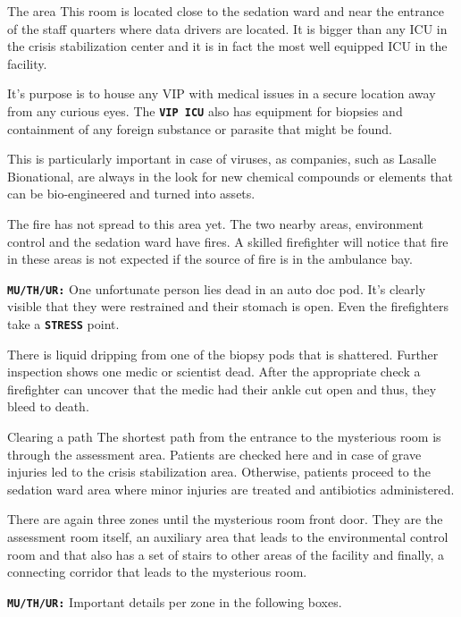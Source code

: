 \begin{rpg-commentbox}{The area}
    This room is located close to the sedation ward and near the entrance of the staff quarters where data drivers are located. It is bigger than any ICU in the crisis stabilization center and it is in fact the most well equipped ICU in the facility.

    It's purpose is to house any VIP with medical issues in a secure location away from any curious eyes. The \texttt{\textbf{VIP ICU}} also has equipment for biopsies and containment of any foreign substance or parasite that might be found. 

    This is particularly important in case of viruses, as companies, such as Lasalle Bionational, are always in the look for new chemical compounds or elements that can be bio-engineered and turned into assets.

    The fire has not spread to this area yet. The two nearby areas, environment control and the sedation ward have fires. A skilled firefighter will notice that fire in these areas is not expected if the source of fire is in the ambulance bay.

    \texttt{\textbf{MU/TH/UR:}} One unfortunate person lies dead in an auto doc pod.
    It's clearly visible that they were restrained and their stomach is open. Even the firefighters take a \texttt{\textbf{STRESS}} point.

    There is liquid dripping from one of the biopsy pods that is shattered. Further inspection shows one medic or scientist dead. After the appropriate check a firefighter can uncover that the medic had their ankle cut open and thus, they bleed to death. 
\end{rpg-commentbox}   



\begin{rpg-commentbox}{Clearing a path}
    The shortest path from the entrance to the mysterious room is through the assessment area. Patients are checked here and in case of grave injuries led to the crisis stabilization area. Otherwise, patients proceed to the sedation ward area where minor injuries are treated and antibiotics administered. 
    
    There are again three zones until the mysterious room front door. They are the assessment room itself, an auxiliary area that leads to the environmental control room and  that also has a set of stairs to other areas of the facility and finally, a connecting corridor that leads to the mysterious room.
    
    \texttt{\textbf{MU/TH/UR:}} Important details per zone in the following boxes.
\end{rpg-commentbox}      

